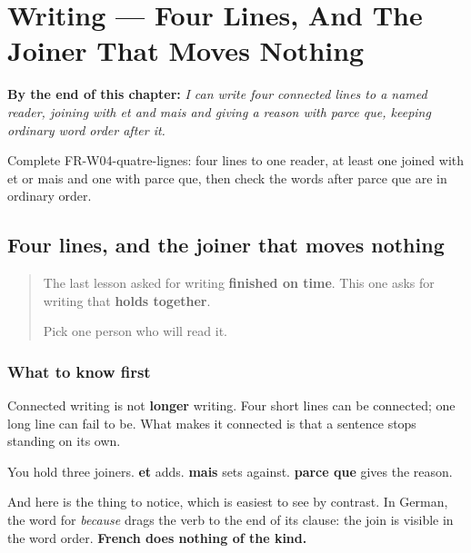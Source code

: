 
\chapter{Writing --- Four Lines, And The Joiner That Moves Nothing}
\label{ch:fr-quatre-lignes}

\begin{chapteropening}
\textbf{By the end of this chapter:} \emph{I can write four connected lines to a named reader, joining with et and mais and giving a reason with parce que, keeping ordinary word order after it.}

Complete FR-W04-quatre-lignes: four lines to one reader, at least one joined with et or mais and one with parce que, then check the words after parce que are in ordinary order.
\end{chapteropening}

\section[parce que]{Four lines, and the joiner that moves nothing}

\label{lesson:FR-W04-quatre-lignes}



\begin{quote}
The last lesson asked for writing \textbf{finished on time}. This one asks for writing that \textbf{holds together}.

Pick one person who will read it.
\end{quote}

\subsection*{What to know first}
Connected writing is not \textbf{longer} writing. Four short lines can be connected; one long line can fail to be. What makes it connected is that a sentence stops standing on its own.

You hold three joiners. \textbf{et} adds. \textbf{mais} sets against. \textbf{parce que} gives the reason.

And here is the thing to notice, which is easiest to see by contrast. In German, the word for \emph{because} drags the verb to the end of its clause: the join is visible in the word order. \textbf{French does nothing of the kind.}

